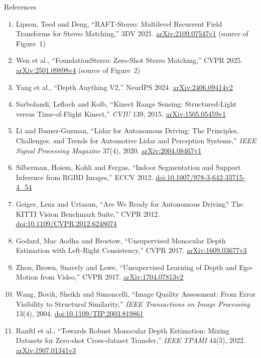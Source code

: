 \begin{frame}[allowframebreaks]{References}
\begin{enumerate}
    \item Lipson, Teed and Deng, ``RAFT-Stereo: Multilevel Recurrent Field Transforms for Stereo Matching,'' 3DV 2021. \href{https://arxiv.org/abs/2109.07547v1}{arXiv:2109.07547v1} (source of Figure~1)
    \item Wen et al., ``FoundationStereo: Zero-Shot Stereo Matching,'' CVPR 2025. \href{https://arxiv.org/abs/2501.09898v4}{arXiv:2501.09898v4} (source of Figure~2)
    \item Yang et al., ``Depth Anything V2,'' NeurIPS 2024. \href{https://arxiv.org/abs/2406.09414v2}{arXiv:2406.09414v2}
    \item Sarbolandi, Lefloch and Kolb, ``Kinect Range Sensing: Structured-Light versus Time-of-Flight Kinect,'' \emph{CVIU} 139, 2015. \href{https://arxiv.org/abs/1505.05459v1}{arXiv:1505.05459v1}
    \item Li and Ibanez-Guzman, ``Lidar for Autonomous Driving: The Principles, Challenges, and Trends for Automotive Lidar and Perception Systems,'' \emph{IEEE Signal Processing Magazine} 37(4), 2020. \href{https://arxiv.org/abs/2004.08467v1}{arXiv:2004.08467v1}
    \item Silberman, Hoiem, Kohli and Fergus, ``Indoor Segmentation and Support Inference from RGBD Images,'' ECCV 2012. \href{https://doi.org/10.1007/978-3-642-33715-4_54}{doi:10.1007/978-3-642-33715-4\_54}
    \item Geiger, Lenz and Urtasun, ``Are We Ready for Autonomous Driving? The KITTI Vision Benchmark Suite,'' CVPR 2012. \href{https://doi.org/10.1109/CVPR.2012.6248074}{doi:10.1109/CVPR.2012.6248074}
    \item Godard, Mac Aodha and Brostow, ``Unsupervised Monocular Depth Estimation with Left-Right Consistency,'' CVPR 2017. \href{https://arxiv.org/abs/1609.03677v3}{arXiv:1609.03677v3}
    \item Zhou, Brown, Snavely and Lowe, ``Unsupervised Learning of Depth and Ego-Motion from Video,'' CVPR 2017. \href{https://arxiv.org/abs/1704.07813v2}{arXiv:1704.07813v2}
    \item Wang, Bovik, Sheikh and Simoncelli, ``Image Quality Assessment: From Error Visibility to Structural Similarity,'' \emph{IEEE Transactions on Image Processing} 13(4), 2004. \href{https://doi.org/10.1109/TIP.2003.819861}{doi:10.1109/TIP.2003.819861}
    \item Ranftl et al., ``Towards Robust Monocular Depth Estimation: Mixing Datasets for Zero-shot Cross-dataset Transfer,'' \emph{IEEE TPAMI} 44(3), 2022. \href{https://arxiv.org/abs/1907.01341v3}{arXiv:1907.01341v3}

\end{enumerate}
\end{frame}
